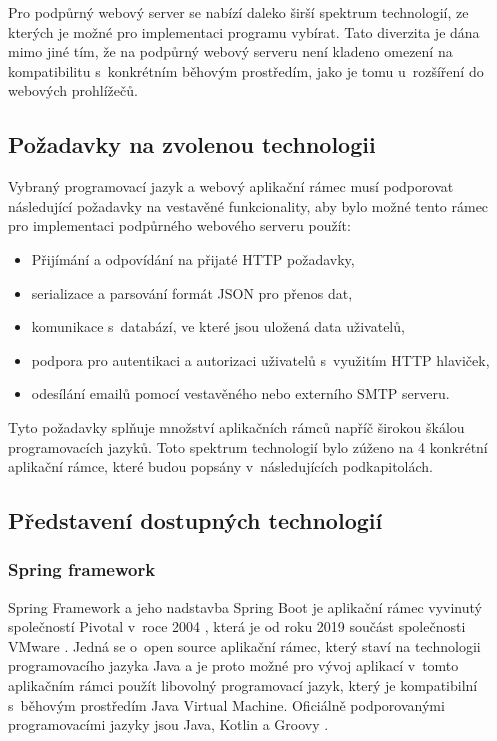 Pro podpůrný webový server se nabízí daleko širší spektrum technologií, ze kterých je možné pro implementaci programu vybírat. Tato diverzita je dána mimo jiné tím, že na podpůrný webový serveru není kladeno omezení na kompatibilitu s~konkrétním běhovým prostředím, jako je tomu u~rozšíření do webových prohlížečů. 

\subsection{Požadavky na zvolenou technologii}\label{sec:pozadavky-na-zvolenou-technologii}

Vybraný programovací jazyk a webový aplikační rámec musí podporovat následující požadavky na vestavěné funkcionality, aby bylo možné tento rámec pro implementaci podpůrného webového serveru použít:

\begin{itemize}
    \item Přijímání a odpovídání na přijaté HTTP požadavky,
    \item serializace a parsování formát JSON pro přenos dat,
    \item komunikace s~databází, ve které jsou uložená data uživatelů,
    \item podpora pro autentikaci a autorizaci uživatelů s~využitím HTTP hlaviček,
    \item odesílání emailů pomocí vestavěného nebo externího SMTP serveru.
\end{itemize}

Tyto požadavky splňuje množství aplikačních rámců napříč širokou škálou programovacích jazyků. Toto spektrum technologií bylo zúženo na 4 konkrétní aplikační rámce, které budou popsány v~následujících podkapitolách.

\subsection{Představení dostupných technologií}

\subsubsection{Spring framework}\label{sec:spring-boot}


Spring Framework a jeho nadstavba Spring Boot je aplikační rámec vyvinutý společností Pivotal v~roce 2004 \cite{risberg_spring_2004}, která je od roku 2019 součást společnosti VMware \cite{vmware_pivotal_acquisition_2019}. Jedná se o~open source aplikační rámec, který staví na technologii programovacího jazyka Java a je proto možné pro vývoj aplikací v~tomto aplikačním rámci použít libovolný programovací jazyk, který je kompatibilní s~běhovým prostředím Java Virtual Machine. Oficiálně podporovanými programovacími jazyky jsou Java, Kotlin a Groovy \cite{spring_framework}.

